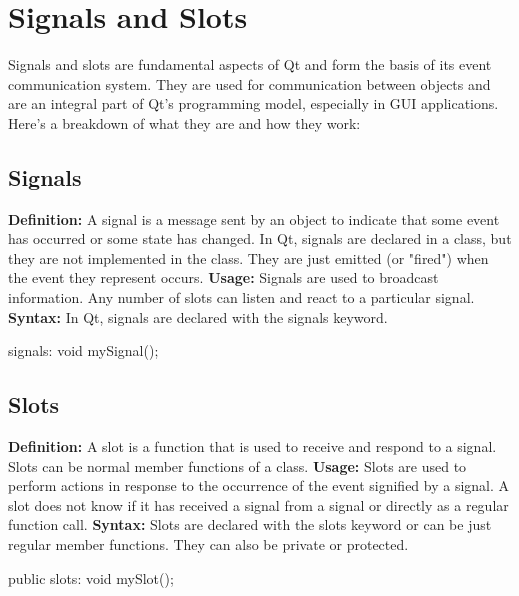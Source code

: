 \documentclass{report}
\begin{document}
    \bigbreak \noindent 
    \section*{Signals and Slots}
    \bigbreak \noindent 
    Signals and slots are fundamental aspects of Qt and form the basis of its event communication system. They are used for communication between objects and are an integral part of Qt's programming model, especially in GUI applications. Here's a breakdown of what they are and how they work:
    \bigbreak \noindent 
    \subsection*{Signals}
    \bigbreak \noindent 
    \textbf{Definition:} A signal is a message sent by an object to indicate that some event has occurred or some state has changed. In Qt, signals are declared in a class, but they are not implemented in the class. They are just emitted (or "fired") when the event they represent occurs.
    \bigbreak \noindent 
    \textbf{Usage:} Signals are used to broadcast information. Any number of slots can listen and react to a particular signal.
    \bigbreak \noindent 
    \textbf{Syntax:} In Qt, signals are declared with the signals keyword.
    \bigbreak \noindent 
    \begin{cppcode}
signals:
    void mySignal();
    \end{cppcode}

    \bigbreak \noindent 
    \subsection*{Slots}
    \bigbreak \noindent 
    \textbf{Definition:} A slot is a function that is used to receive and respond to a signal. Slots can be normal member functions of a class.
    \bigbreak \noindent 
    \textbf{Usage:} Slots are used to perform actions in response to the occurrence of the event signified by a signal. A slot does not know if it has received a signal from a signal or directly as a regular function call.
    \bigbreak \noindent 
    \textbf{Syntax:} Slots are declared with the slots keyword or can be just regular member functions. They can also be private or protected.
    \bigbreak \noindent 
    \begin{cppcode}
public slots:
    void mySlot();
    \end{cppcode}
\end{document}
